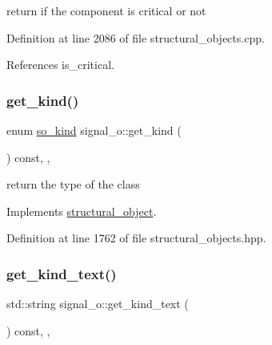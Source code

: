 return if the component is critical or not 



Definition at line 2086 of file structural\+\_\+objects.\+cpp.



References is\+\_\+critical.

\mbox{\label{classsignal__o_a4407c1e66d004e623ccdc8b57d5fb385}} 
\subsubsection{\texorpdfstring{get\+\_\+kind()}{get\_kind()}}
{\footnotesize\ttfamily enum \hyperlink{structural__objects_8hpp_acf52399aecacb7952e414c5746ce6439}{so\+\_\+kind} signal\+\_\+o\+::get\+\_\+kind (\begin{DoxyParamCaption}{ }\end{DoxyParamCaption}) const\hspace{0.3cm}{\ttfamily [inline]}, {\ttfamily [override]}, {\ttfamily [virtual]}}



return the type of the class 



Implements \hyperlink{classstructural__object_ad9f487c3b7774ecd4e2f55979c434cd0}{structural\+\_\+object}.



Definition at line 1762 of file structural\+\_\+objects.\+hpp.

\mbox{\label{classsignal__o_a66d4342659804e8d1ed84d471313fc68}} 
\subsubsection{\texorpdfstring{get\+\_\+kind\+\_\+text()}{get\_kind\_text()}}
{\footnotesize\ttfamily std\+::string signal\+\_\+o\+::get\+\_\+kind\+\_\+text (\begin{DoxyParamCaption}{ }\end{DoxyParamCaption}) const\hspace{0.3cm}{\ttfamily [inline]}, {\ttfamily [override]}, {\ttfamily [virtual]}}



